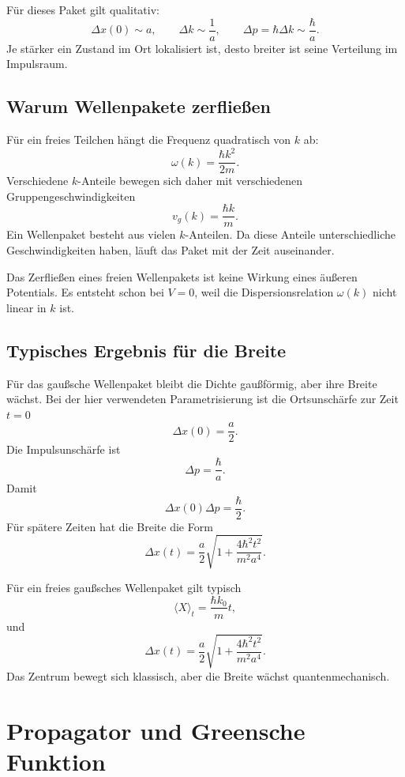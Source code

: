 \begin{examplebox}
Für dieses Paket gilt qualitativ:
\[
    \Delta x(0)\sim a,
    \qquad
    \Delta k\sim \frac{1}{a},
    \qquad
    \Delta p=\hbar\Delta k\sim \frac{\hbar}{a}.
\]
Je stärker ein Zustand im Ort lokalisiert ist, desto breiter ist seine Verteilung im Impulsraum.
\end{examplebox}

\subsection{Warum Wellenpakete zerfließen}

Für ein freies Teilchen hängt die Frequenz quadratisch von $k$ ab:
\[
    \omega(k)=\frac{\hbar k^2}{2m}.
\]
Verschiedene $k$-Anteile bewegen sich daher mit verschiedenen Gruppengeschwindigkeiten
\[
    v_g(k)=\frac{\hbar k}{m}.
\]
Ein Wellenpaket besteht aus vielen $k$-Anteilen. Da diese Anteile unterschiedliche Geschwindigkeiten haben, läuft das Paket mit der Zeit auseinander.

\begin{conceptbox}
Das Zerfließen eines freien Wellenpakets ist keine Wirkung eines äußeren Potentials. Es entsteht schon bei $V=0$, weil die Dispersionsrelation $\omega(k)$ nicht linear in $k$ ist.
\end{conceptbox}

\subsection{Typisches Ergebnis für die Breite}

Für das gaußsche Wellenpaket bleibt die Dichte gaußförmig, aber ihre Breite wächst. Bei der hier verwendeten Parametrisierung ist die Ortsunschärfe zur Zeit $t=0$
\[
    \Delta x(0)=\frac{a}{2}.
\]
Die Impulsunschärfe ist
\[
    \Delta p=\frac{\hbar}{a}.
\]
Damit
\[
    \Delta x(0)\Delta p=\frac{\hbar}{2}.
\]
Für spätere Zeiten hat die Breite die Form
\[
    \Delta x(t)=\frac{a}{2}\sqrt{1+\frac{4\hbar^2t^2}{m^2a^4}}.
\]

\begin{formulabox}
Für ein freies gaußsches Wellenpaket gilt typisch
\[
    \langle X\rangle_t=\frac{\hbar k_0}{m}t,
\]
und
\[
    \Delta x(t)=\frac{a}{2}\sqrt{1+\frac{4\hbar^2t^2}{m^2a^4}}.
\]
Das Zentrum bewegt sich klassisch, aber die Breite wächst quantenmechanisch.
\end{formulabox}

\section{Propagator und Greensche Funktion}

